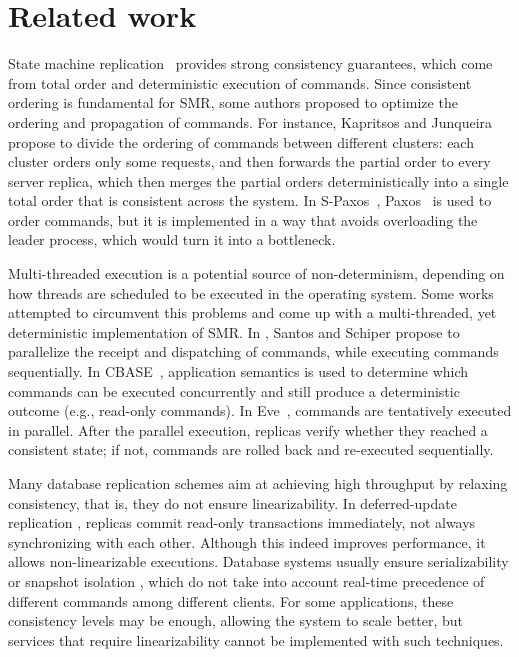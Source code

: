 \section{Related work}
\label{sec:rw}

State machine replication~\cite{Kapritsos:2012um, kotla2004htbft, Lam78, santos2013htsmr, Sch90} provides strong consistency guarantees, which come from total order and deterministic execution of commands.
Since consistent ordering is fundamental for SMR, some authors proposed to optimize the ordering and propagation of commands.
For instance, Kapritsos and Junqueira~\cite{kapritsos2010scalable} propose to divide the ordering of commands between different clusters: each cluster orders only some requests, and then forwards the partial order to every server replica, which then merges the partial orders deterministically into a single total order that is consistent across the system.
In S-Paxos~\cite{biely2012spaxos}, Paxos~\cite{Lamport:1998ea} is used to order commands, but it is implemented in a way that avoids overloading the leader process, which would turn it into a bottleneck.

Multi-threaded execution is a potential source of non-determinism, depending on how threads are scheduled to be executed in the operating system.
Some works attempted to circumvent this problems and come up with a multi-threaded, yet deterministic implementation of SMR.
In \cite{santos2013htsmr}, Santos and Schiper propose to parallelize the receipt and dispatching of commands, while executing commands sequentially.
In CBASE~\cite{kotla2004htbft}, application semantics is used to determine which commands can be executed concurrently and still produce a deterministic outcome (e.g., read-only commands).
In Eve~\cite{Kapritsos:2012um}, commands are tentatively executed in parallel.
After the parallel execution, replicas verify whether they reached a consistent state; if not, commands are rolled back and re-executed sequentially.

Many database replication schemes aim at achieving high throughput by relaxing consistency, that is, they do not ensure linearizability.
In deferred-update replication \cite{chundi96dur, kobus2013hybrid, sciascia2012sdur, SousaOMP01}, replicas commit read-only transactions immediately, not always synchronizing with each other.
Although this indeed improves performance, it allows non-linearizable executions.
Database systems usually ensure serializability \cite{BHG87} or snapshot isolation \cite{LinKJPA09}, which do not take into account real-time precedence of different commands among different clients. 
For some applications, these consistency levels may be enough, allowing the system to scale better, but services that require linearizability cannot be implemented with such techniques.

